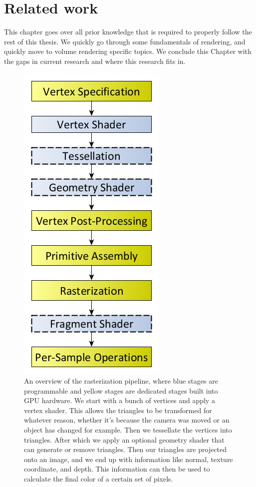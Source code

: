 \section{Related work} \label{related_work}
This chapter goes over all prior knowledge that is required to properly follow the rest of this thesis. We quickly go through some fundamentals of rendering, and quickly move to volume rendering specific topics. We conclude this Chapter with the gaps in current research and where this research fits in.



\begin{figure}
    \centering
    \includegraphics[width=0.5\linewidth]{figures/rasterization_pipeline.png}
    \caption{An overview of the rasterization pipeline, where blue stages are programmable and yellow stages are dedicated stages built into GPU hardware. We start with a bunch of vertices and apply a vertex shader. This allows the triangles to be transformed for whatever reason, whether it's because the camera was moved or an object has changed for example. Then we tessellate the vertices into triangles. After which we apply an optional geometry shader that can generate or remove triangles. Then our triangles are projected onto an image, and we end up with information like normal, texture coordinate, and depth. This information can then be used to calculate the final color of a certain set of pixels. \cite{RasterPipeline}}
    \label{fig:rasterization_pipeline}
\end{figure}


